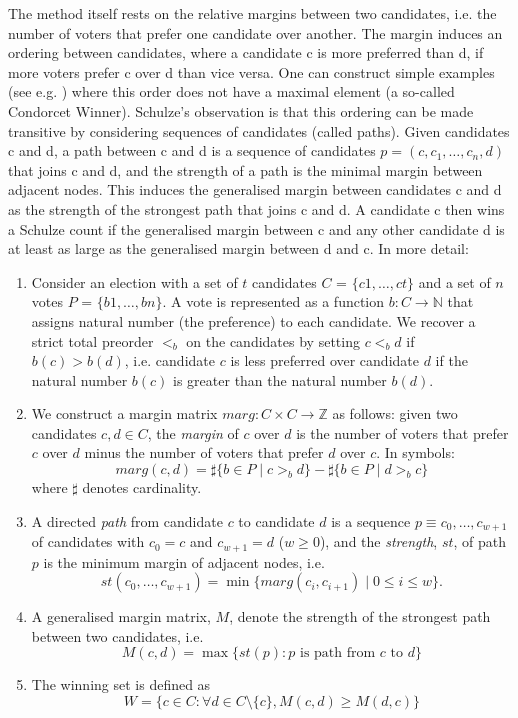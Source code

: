 \documentclass[compsoc,conference,a4paper,10pt,times]{IEEEtran}
\begin{document}
    
    The  method itself rests on the relative margins between two candidates, i.e. the number of voters that prefer one candidate over another. The margin induces an ordering between candidates, where a candidate c is more preferred than d, if more voters prefer c over d than vice versa. One can construct simple examples (see e.g. \cite{Rivest:2010:OSW}) where this order does not have 
    a maximal element (a so-called Condorcet Winner). Schulze’s observation is that this 
    ordering can be made transitive by considering sequences of candidates (called paths). 
    Given candidates c and d, a path between c and d is a sequence of candidates 
    $p= (c,c_{1}, \dots ,c_{n},d)$ that joins c and d, and the strength of a path is the 
    minimal margin between adjacent nodes. This induces the generalised margin between 
    candidates c and d as the strength of the strongest path that joins c and d. 
    A candidate c then wins a Schulze count if the generalised margin between c 
    and any other candidate d is at least as large as the generalised margin between d and c.
    In more detail:

\begin{enumerate}  

\item Consider an election with a set of $t$ candidates
    $C$ = $\{c1,\dots,ct\}$ and 
	a set of $n$ votes $P$ = $\{b1,\dots,bn\}$. A vote
	is represented as a function $b: C \rightarrow \mathbb{N}$ that 
	assigns natural 
	number (the preference) to each candidate. 
	We recover a strict total 
	preorder $<_b$ on the candidates by setting $c <_b d$ if $b(c) > b(d)$, i.e. 
	candidate $c$ is less preferred over candidate $d$ if the natural number $b(c)$ is greater
	than the natural number $b(d)$. 
	
\item We construct a margin matrix $marg : C \times C \to \mathbb{Z}$ as follows: 
    given two candidates $c, d \in C$, the \emph{margin} of $c$ over $d$ is
    the number of voters that prefer $c$ over $d$ minus the number of voters
    that prefer $d$ over $c$. In symbols:
\[
  marg (c, d) = \sharp \lbrace b \in P \mid c >_b d \rbrace -
            \sharp \lbrace b \in P \mid d >_b c \rbrace
\] where $\sharp$ denotes cardinality.


\item A directed \emph{path} from
candidate $c$ to candidate $d$ is a sequence $p \equiv c_0, \dots, c_{w+1}$
of candidates with $c_0 = c$ and $c_{w+1} = d$ ($w \geq 0$), and the
\emph{strength}, $st$, of path $p$ is the minimum margin of adjacent
nodes, i.e.
\[ st(c_0, \dots, c_{w+1}) = \min \lbrace marg (c_i, c_{i+1}) \mid 0 
\leq i \leq w \rbrace. \]
\item  A generalised margin matrix, $M$, denote the strength of the strongest path
	between two candidates, i.e. 
	\[ M(c, d) = \max \lbrace st (p) : p \text{ is path from } c \text{ to } d\rbrace \]
	
\item The winning set  is defined as 
 \[ W =  \lbrace c \in C : \forall d \in C \setminus \{c\}, M (c, d) \geq M (d, c) \rbrace\]

\end{enumerate}
\end{document}
